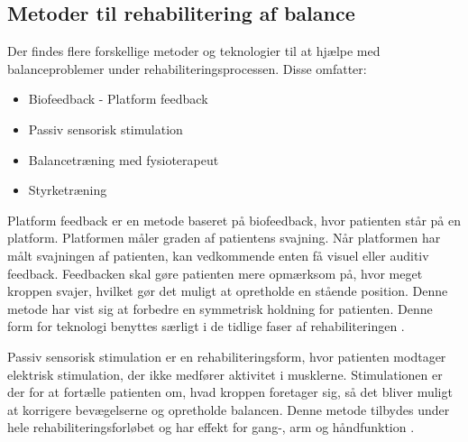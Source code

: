 \subsection{Metoder til rehabilitering af balance}

Der findes flere forskellige metoder og teknologier til at hjælpe med balanceproblemer  under rehabiliteringsprocessen. Disse omfatter: \cite{Sundhedsstyrelsen2011a}  

\begin{itemize}
\item Biofeedback - Platform feedback
\item Passiv sensorisk stimulation
\item Balancetræning med fysioterapeut
\item Styrketræning
\end{itemize}

Platform feedback er en metode baseret på biofeedback, hvor patienten står på en platform. Platformen måler graden af patientens svajning. Når platformen har målt svajningen af patienten, kan vedkommende enten få visuel eller auditiv feedback. Feedbacken skal gøre patienten mere opmærksom på, hvor meget kroppen svajer, hvilket gør det muligt at opretholde en stående position. Denne metode har vist sig at forbedre en symmetrisk holdning for patienten. \cite{Barclay-Goddard2004} Denne form for teknologi benyttes særligt i de tidlige faser af rehabiliteringen \cite{Sundhedsstyrelsen2011a}.

Passiv sensorisk stimulation er en rehabiliteringsform, hvor patienten modtager elektrisk stimulation, der ikke medfører aktivitet i musklerne. Stimulationen er der for at fortælle patienten om, hvad kroppen foretager sig, så det bliver muligt at korrigere bevægelserne og opretholde balancen. \cite{Sundhedsstyrelsen2010} Denne metode tilbydes under hele rehabiliteringsforløbet og har effekt for gang-, arm og håndfunktion \cite{Sundhedsstyrelsen2011a}.

